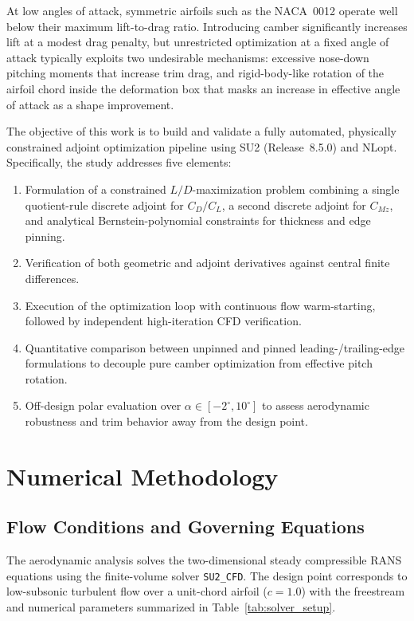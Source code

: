 \documentclass[11pt,a4paper]{article}
\begin{document}
At low angles of attack, symmetric airfoils such as the NACA~0012 operate well below their maximum lift-to-drag ratio. Introducing camber significantly increases lift at a modest drag penalty, but unrestricted optimization at a fixed angle of attack typically exploits two undesirable mechanisms: excessive nose-down pitching moments that increase trim drag, and rigid-body-like rotation of the airfoil chord inside the deformation box that masks an increase in effective angle of attack as a shape improvement.

The objective of this work is to build and validate a fully automated, physically constrained adjoint optimization pipeline using SU2 (Release~8.5.0) and NLopt. Specifically, the study addresses five elements:
\begin{enumerate}
    \item Formulation of a constrained $L/D$-maximization problem combining a single quotient-rule discrete adjoint for $C_D/C_L$, a second discrete adjoint for $C_{Mz}$, and analytical Bernstein-polynomial constraints for thickness and edge pinning.
    \item Verification of both geometric and adjoint derivatives against central finite differences.
    \item Execution of the optimization loop with continuous flow warm-starting, followed by independent high-iteration CFD verification.
    \item Quantitative comparison between unpinned and pinned leading-/trailing-edge formulations to decouple pure camber optimization from effective pitch rotation.
    \item Off-design polar evaluation over $\alpha \in [-2^\circ, 10^\circ]$ to assess aerodynamic robustness and trim behavior away from the design point.
\end{enumerate}

\section{Numerical Methodology}

\subsection{Flow Conditions and Governing Equations}

The aerodynamic analysis solves the two-dimensional steady compressible RANS equations using the finite-volume solver \texttt{SU2\_CFD}. The design point corresponds to low-subsonic turbulent flow over a unit-chord airfoil ($c = 1.0$) with the freestream and numerical parameters summarized in Table~\ref{tab:solver_setup}.
\end{document}
